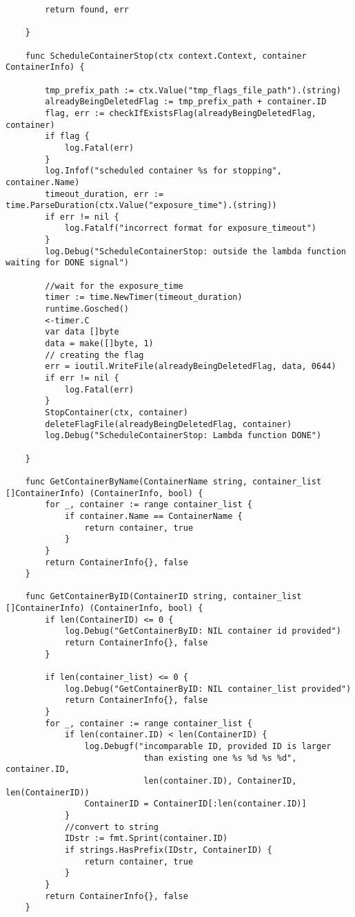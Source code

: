 \begin{verbatim}
        return found, err
    
    }
    
    func ScheduleContainerStop(ctx context.Context, container ContainerInfo) {
    
        tmp_prefix_path := ctx.Value("tmp_flags_file_path").(string)
        alreadyBeingDeletedFlag := tmp_prefix_path + container.ID
        flag, err := checkIfExistsFlag(alreadyBeingDeletedFlag, container)
        if flag {
            log.Fatal(err)
        }
        log.Infof("scheduled container %s for stopping", container.Name)
        timeout_duration, err := time.ParseDuration(ctx.Value("exposure_time").(string))
        if err != nil {
            log.Fatalf("incorrect format for exposure_timeout")
        }
        log.Debug("ScheduleContainerStop: outside the lambda function waiting for DONE signal")
    
        //wait for the exposure_time
        timer := time.NewTimer(timeout_duration)
        runtime.Gosched()
        <-timer.C
        var data []byte
        data = make([]byte, 1)
        // creating the flag
        err = ioutil.WriteFile(alreadyBeingDeletedFlag, data, 0644)
        if err != nil {
            log.Fatal(err)
        }
        StopContainer(ctx, container)
        deleteFlagFile(alreadyBeingDeletedFlag, container)
        log.Debug("ScheduleContainerStop: Lambda function DONE")
    
    }
    
    func GetContainerByName(ContainerName string, container_list []ContainerInfo) (ContainerInfo, bool) {
        for _, container := range container_list {
            if container.Name == ContainerName {
                return container, true
            }
        }
        return ContainerInfo{}, false
    }
    
    func GetContainerByID(ContainerID string, container_list []ContainerInfo) (ContainerInfo, bool) {
        if len(ContainerID) <= 0 {
            log.Debug("GetContainerByID: NIL container id provided")
            return ContainerInfo{}, false
        }
    
        if len(container_list) <= 0 {
            log.Debug("GetContainerByID: NIL container_list provided")
            return ContainerInfo{}, false
        }
        for _, container := range container_list {
            if len(container.ID) < len(ContainerID) {
                log.Debugf("incomparable ID, provided ID is larger 
                            than existing one %s %d %s %d", container.ID,
                            len(container.ID), ContainerID, len(ContainerID))
                ContainerID = ContainerID[:len(container.ID)]
            }
            //convert to string
            IDstr := fmt.Sprint(container.ID)
            if strings.HasPrefix(IDstr, ContainerID) {
                return container, true
            }
        }
        return ContainerInfo{}, false
    }
    

\end{verbatim}
